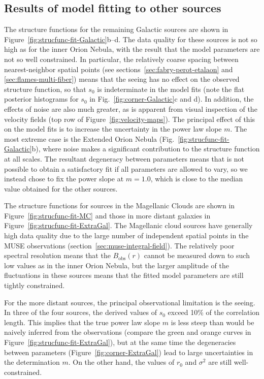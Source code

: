 \documentclass[fleqn,usenatbib, useAMS, a4paper]{mnras}
\newcommand\obs{\ensuremath{_{\mathrm{obs}}}}
\begin{document}
\subsection{Results of model fitting to other sources}
\label{sec:results-model-fitt}

The structure functions for the remaining Galactic sources
are shown in Figure~\ref{fig:strucfunc-fit-Galactic}b--d.
The data quality for these sources is not so high as for the inner Orion Nebula,
with the result that the model parameters are not so well constrained.
In particular, the relatively coarse spacing between nearest-neighbor spatial points
(see sections~\ref{sec:fabry-perot-etalaon} and \ref{sec:flames-multi-fiber})
means that the seeing has no effect on the observed structure function,
so that \(s_0\) is indeterminate in the model fits
(note the flat posterior histograms for \(s_0\) in Fig.~\ref{fig:corner-Galactic}c and d).
In addition, the effects of noise are also much greater,
as is apparent from visual inspection of the velocity fields
(top row of Figure~\ref{fig:velocity-maps}).
The principal effect of this on the model fits is to increase the uncertainty
in the power law slope \(m\).
The most extreme case is the Extended Orion Nebula (Fig.~\ref{fig:strucfunc-fit-Galactic}b),
where noise makes a significant contribution to the structure function at all scales.
The resultant degeneracy between parameters means that
is not possible to obtain a satisfactory fit
if all parameters are allowed to vary,
so we instead chose to fix the power slope at \(m = 1.0\),
which is close to the median value obtained for the other sources.

The structure functions for sources in the Magellanic Clouds are shown in Figure~\ref{fig:strucfunc-fit-MC}
and those in more distant galaxies in Figure~\ref{fig:strucfunc-fit-ExtraGal}.
The Magellanic cloud sources have generally high data quality due to the
large number of independent spatial points in the MUSE observations
(section~\ref{sec:muse-integral-field}).
The relatively poor spectral resolution means that the \(B\obs(r)\) cannot
be measured down to such low values as in the inner Orion Nebula,
but the larger amplitude of the fluctuations in these sources means
that the fitted model parameters are still tightly constrained.

For the more distant sources, the principal observational limitation is the seeing.
In three of the four sources,
the derived values of \(s_0\) exceed 10\% of the correlation length.
This implies that the true power law slope \(m\) is less steep than
would be naively inferred from the observations
(compare the green and orange curves in Figure~\ref{fig:strucfunc-fit-ExtraGal}),
but at the same time the degeneracies between parameters
(Figure~\ref{fig:corner-ExtraGal})
lead to large uncertainties in the determination \(m\).
On the other hand, the values of \(r_0\) and \(\sigma^2\) are still well-constrained.
\end{document}
